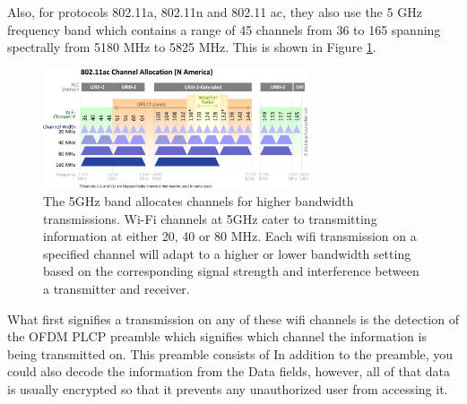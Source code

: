 Also, for protocols 802.11a, 802.11n and 802.11 ac, they also use the 5 GHz frequency band which contains a range of 45 channels from 36 to 165 spanning spectrally from 5180 MHz to 5825 MHz.  This is shown in Figure \ref{fig:5GHz_channel}.
\begin{figure}[ht]
\centering
\includegraphics[width=0.70\textwidth]{img/5_GHz_Channels.png}
\caption{The 5GHz band allocates channels for higher bandwidth transmissions.  Wi-Fi channels at 5GHz cater to transmitting information at either 20, 40 or 80 MHz. Each wifi transmission on a specified channel will adapt to a higher or lower bandwidth setting based on the corresponding signal strength and interference between a transmitter and receiver.}
\label{fig:5GHz_channel}
\end{figure}
What first signifies a transmission on any of these wifi channels is the detection of the OFDM PLCP preamble which signifies which channel the information is being transmitted on. This preamble consists of  In addition to the preamble, you could also decode the information from the Data fields, however, all of that data is usually encrypted so that it prevents any unauthorized user from accessing it. \cite{wifi_book}

